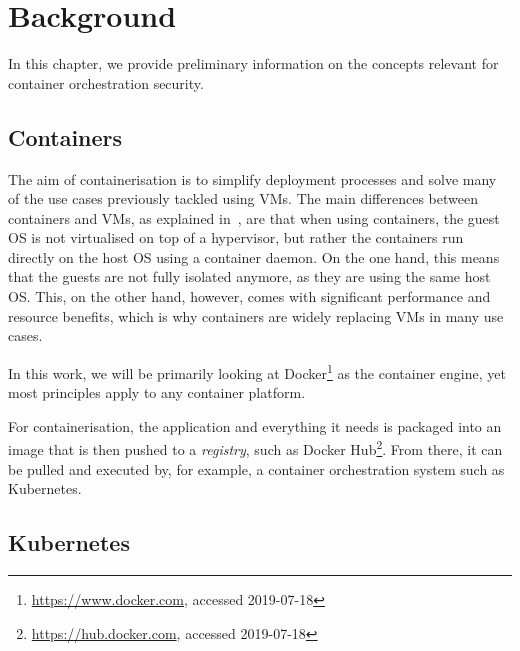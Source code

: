 
\chapter{Background} \label{cha:background}

In this chapter, we provide preliminary information on the concepts relevant for container orchestration security.

\section{Containers}

The aim of containerisation is to simplify deployment processes and solve many of the use cases previously tackled using \acp{VM}. The main differences between containers and \acp{VM}, as explained in~\textcite{containersVsVMs}, are that when using containers, the guest OS is not virtualised on top of a hypervisor, but rather the containers run directly on the host OS using a container daemon. On the one hand, this means that the guests are not fully isolated anymore, as they are using the same host OS. This, on the other hand, however, comes with significant performance and resource benefits, which is why containers are widely replacing \acp{VM} in many use cases.

In this work, we will be primarily looking at Docker\footnote{\url{https://www.docker.com}, accessed 2019-07-18} as the container engine, yet most principles apply to any container platform.

For containerisation, the application and everything it needs is packaged into an image that is then pushed to a \textit{registry}, such as Docker Hub\footnote{\url{https://hub.docker.com}, accessed 2019-07-18}. From there, it can be pulled and executed by, for example, a container orchestration system such as Kubernetes. 

\section{Kubernetes}


